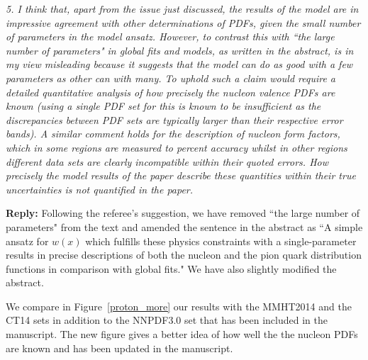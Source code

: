 \documentclass[12pt]{article}
\begin{document}
{\it 5. I think that, apart from the issue just discussed, the results of
the model are in impressive agreement with other determinations of
PDFs, given the small number of parameters in the model ansatz.
However, to contrast this with ``the large number of parameters" in
global fits and models, as written in the abstract, is in my view
misleading because it suggests that the model can do as good with a
few parameters as other can with many. To uphold such a claim would
require a detailed quantitative analysis of how precisely the nucleon
valence PDFs are known (using a single PDF set for this is known to be
insufficient as the discrepancies between PDF sets are typically
larger than their respective error bands). A similar comment holds for
the description of nucleon form factors, which in some regions are
measured to percent accuracy whilst in other regions different data
sets are clearly incompatible within their quoted errors. How
precisely the model results of the paper describe these quantities
within their true uncertainties is not quantified in the paper.}

{\bf Reply:} Following the referee's suggestion, we have removed ``the large number of parameters" from the text and amended the sentence in the abstract as  ``A simple ansatz for $w(x)$ which fulfills these physics
constraints with a single-parameter results in precise descriptions of both the nucleon and the pion
quark distribution functions in comparison with global fits." We have also slightly modified the abstract.

We  compare in Figure~\ref{proton_more} our results with the MMHT2014 and the CT14 sets in addition to the NNPDF3.0 set that has been included in the manuscript. The new figure gives a better idea of how well the the nucleon PDFs are known and has been updated in the manuscript.
\end{document}
